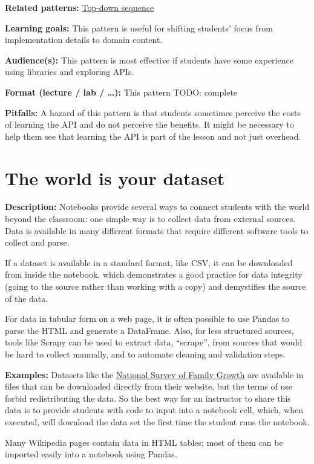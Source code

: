 \documentclass[]{book}
\begin{document}
\textbf{Related patterns:}
\protect\hyperlink{top-down-sequence}{Top-down sequence}

\textbf{Learning goals:} This pattern is useful for shifting students'
focus from implementation details to domain content.

\textbf{Audience(s):} This pattern is most effective if students have
some experience using libraries and exploring APIs.

\textbf{Format (lecture / lab / \ldots{}):} This pattern TODO: complete

\textbf{Pitfalls:} A hazard of this pattern is that students sometimes
perceive the costs of learning the API and do not perceive the benefits.
It might be necessary to help them see that learning the API is part of
the lesson and not just overhead.

\section{The world is your dataset}\label{the-world-is-your-dataset}

\textbf{Description:} Notebooks provide several ways to connect students
with the world beyond the classroom: one simple way is to collect data
from external sources. Data is available in many different formats that
require different software tools to collect and parse.

If a dataset is available in a standard format, like CSV, it can be
downloaded from inside the notebook, which demonstrates a good practice
for data integrity (going to the source rather than working with a copy)
and demystifies the source of the data.

For data in tabular form on a web page, it is often possible to use
Pandas to parse the HTML and generate a DataFrame. Also, for less
structured sources, tools like Scrapy can be used to extract data,
``scrape'', from sources that would be hard to collect manually, and to
automate cleaning and validation steps.

\textbf{Examples:} Datasets like the
\href{https://www.cdc.gov/nchs/nsfg/index.htm}{National Survey of Family
Growth} are available in files that can be downloaded directly from
their website, but the terms of use forbid redistributing the data. So
the best way for an instructor to share this data is to provide students
with code to input into a notebook cell, which, when executed, will
download the data set the first time the student runs the notebook.

Many Wikipedia pages contain data in HTML tables; most of them can be
imported easily into a notebook using Pandas.
\end{document}
